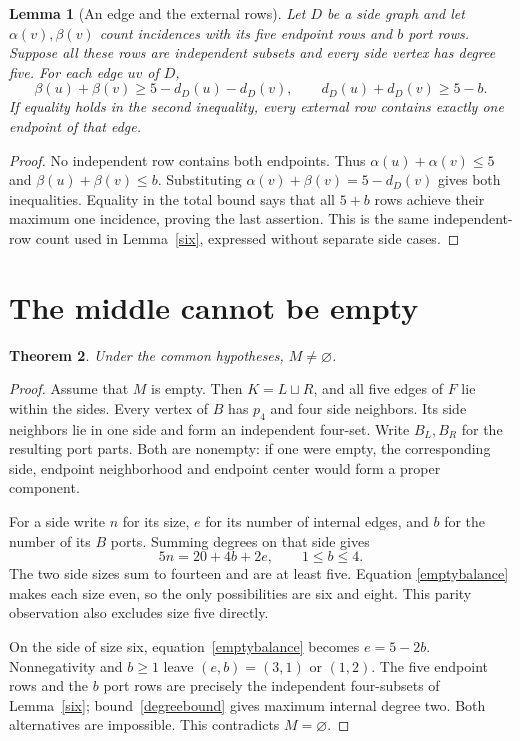 \documentclass[11pt]{article}
\newtheorem{theorem}{Theorem}
\newtheorem{lemma}[theorem]{Lemma}
\begin{document}
\begin{lemma}[An edge and the external rows]\label{rowbound}
Let $D$ be a side graph and let $\alpha(v),\beta(v)$ count incidences
with its five endpoint rows and $b$ port rows. Suppose all these rows
are independent subsets and every side vertex has degree five. For
each edge $uv$ of $D$,
\begin{equation}\label{rowedge}
 \beta(u)+\beta(v)\geq5-d_D(u)-d_D(v),\qquad
 d_D(u)+d_D(v)\geq5-b.
\end{equation}
If equality holds in the second inequality, every external row contains
exactly one endpoint of that edge.
\end{lemma}
\begin{proof}
No independent row contains both endpoints. Thus
$\alpha(u)+\alpha(v)\leq5$ and
$\beta(u)+\beta(v)\leq b$. Substituting
$\alpha(v)+\beta(v)=5-d_D(v)$ gives both inequalities. Equality in
the total bound says that all $5+b$ rows achieve their maximum one
incidence, proving the last assertion. This is the same independent-row
count used in Lemma~\ref{six}, expressed without separate side cases.
\end{proof}

\section*{The middle cannot be empty}

\begin{theorem}\label{nonempty}
Under the common hypotheses, $M\ne\varnothing$.
\end{theorem}
\begin{proof}
Assume that $M$ is empty. Then $K=L\sqcup R$, and all five edges of
$F$ lie within the sides. Every vertex of $B$ has $p_4$ and four side
neighbors. Its side neighbors lie in one side and form an independent
four-set. Write $B_L,B_R$ for the resulting port parts. Both are
nonempty: if one were empty, the corresponding side, endpoint
neighborhood and endpoint center would form a proper component.

For a side write $n$ for its size, $e$ for its number of internal edges,
and $b$ for the number of its $B$ ports. Summing degrees on that side
gives
\begin{equation}\label{emptybalance}
 5n=20+4b+2e,\qquad 1\leq b\leq4.
\end{equation}
The two side sizes sum to fourteen and are at least five. Equation
\eqref{emptybalance} makes each size even, so the only possibilities
are six and eight. This parity observation also excludes size five
directly.

On the side of size six, equation~\eqref{emptybalance} becomes
$e=5-2b$. Nonnegativity and $b\geq1$ leave $(e,b)=(3,1)$ or $(1,2)$.
The five endpoint rows and the $b$ port rows are precisely the
independent four-subsets of Lemma~\ref{six}; bound~\eqref{degreebound}
gives maximum internal degree two. Both alternatives are impossible.
This contradicts $M=\varnothing$.
\end{proof}
\end{document}
